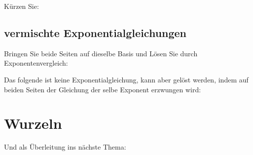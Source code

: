 \noTRAINER{\newpage}
\newpage
Kürzen Sie:


\newpage
\subsection{vermischte Exponentialgleichungen}
Bringen Sie beide Seiten auf dieselbe Basis und Lösen Sie durch
Exponentenvergleich:



Das folgende ist keine Exponentialgleichung, kann aber gelöst werden,
indem auf beiden Seiten der Gleichung der selbe Exponent erzwungen
wird:



\newpage
\section{Wurzeln}


\noTRAINER{\newpage}


\noTRAINER{\newpage}


\noTRAINER{\newpage}


\noTRAINER{\newpage}


\noTRAINER{\newpage}

\noTRAINER{\newpage}

Und als Überleitung ins nächste Thema:


